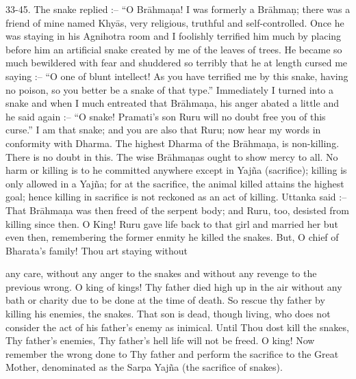 33-45. The snake replied :-- ``O Br\=ahma\d{n}a! I was formerly a Br\=ahma\d{n}; there was a friend of mine named Khy\=as, very religious, truthful and self-controlled. Once he was staying in his Agnihotra room and I foolishly terrified him much by placing before him an artificial snake created by me of the leaves of trees. He became so much bewildered with fear and shuddered so terribly that he at length cursed me saying :-- ``O one of blunt intellect! As you have terrified me by this snake, having no poison, so you better be a snake of that type.'' Immediately I turned into a snake and when I much entreated that Br\=ahma\d{n}a, his anger abated a little and he said again :-- ``O snake! Pramati's son Ruru will no doubt free you of this curse.'' I am that snake; and you are also that Ruru; now hear my words in conformity with Dharma. The highest Dharma of the Br\=ahma\d{n}a, is non-killing. There is no doubt in this. The wise Br\=ahma\d{n}as ought to show mercy to all. No harm or killing is to he committed anywhere except in Yaj\~na (sacrifice); killing is only allowed in a Yaj\~na; for at the sacrifice, the animal killed attains the highest goal; hence killing in sacrifice is not reckoned as an act of killing. Uttanka said :-- That Br\=ahma\d{n}a was then freed of the serpent body; and Ruru, too, desisted from killing since then. O King! Ruru gave life back to that girl and married her but even then, remembering the former enmity he killed the snakes. But, O chief of Bharata's family! Thou art staying without

any care, without any anger to the snakes and without any revenge to the previous wrong. O king of kings! Thy father died high up in the air without any bath or charity due to be done at the time of death. So rescue thy father by killing his enemies, the snakes. That son is dead, though living, who does not consider the act of his father's enemy as inimical. Until Thou dost kill the snakes, Thy father's enemies, Thy father's hell life will not be freed. O king! Now remember the wrong done to Thy father and perform the sacrifice to the Great Mother, denominated as the Sarpa Yaj\~na (the sacrifice of snakes).

